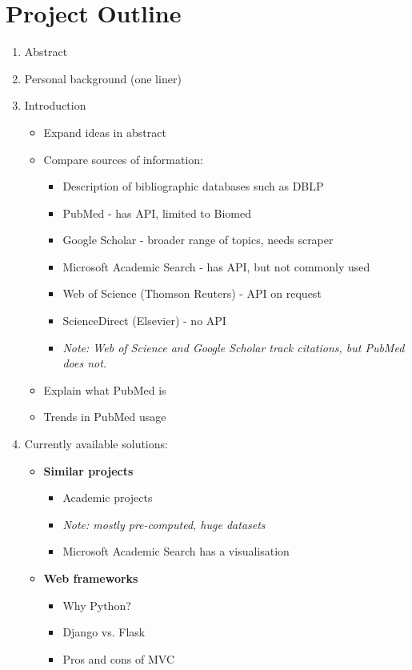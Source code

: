 \documentclass[a4paper,12pt]{article}
\begin{document}
\section{Project Outline}
\begin{enumerate}
	\item Abstract
	\item Personal background (one liner)
	\item Introduction
	\begin{itemize}
		\item Expand ideas in abstract						
		\item Compare sources of information: 
		\begin{itemize}
			\item Description of bibliographic databases such as DBLP
			\item PubMed - has API, limited to Biomed
			\item Google Scholar - broader range of topics, needs scraper
			\item Microsoft Academic Search - has API, but not commonly used
			\item Web of Science (Thomson Reuters) - API on request
			\item ScienceDirect (Elsevier) - no API
			\item \emph{Note: Web of Science and Google Scholar track citations, but PubMed does not.}
		\end{itemize}
		\item Explain what PubMed is
		\item Trends in PubMed usage
		\end{itemize}
	\item Currently available solutions:
	\begin{itemize}
		\item \textbf{Similar projects}
		\begin{itemize}
			\item Academic projects 
			\item \emph{Note: mostly pre-computed, huge datasets}
			\item Microsoft Academic Search has a visualisation
		\end{itemize}
		\item \textbf{Web frameworks}
		\begin{itemize}
			\item Why Python?
			\item Django vs. Flask
			\item Pros and cons of MVC
		\end{itemize}

\end{itemize}
\end{enumerate}
\end{document}
